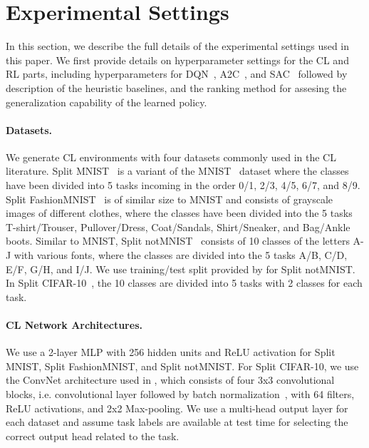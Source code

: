 
\section{Experimental Settings}\label{paperD:app:experimental_settings}

In this section, we describe the full details of the experimental settings used in this paper. We first provide details on hyperparameter settings for the CL and RL parts, including hyperparameters for DQN~, A2C~, and SAC~ followed by description of the heuristic baselines, and the ranking method for assesing the generalization capability of the learned policy.  



\vspace{-3mm}
\paragraph{Datasets.}
We generate CL environments with four datasets commonly used in the CL literature. 
Split MNIST~ is a variant of the MNIST~ dataset where the classes have been divided into 5 tasks incoming in the order 0/1, 2/3, 4/5, 6/7, and 8/9. Split FashionMNIST~ is of similar size to MNIST and consists of grayscale images of different clothes, where the classes have been divided into the 5 tasks T-shirt/Trouser, Pullover/Dress, Coat/Sandals, Shirt/Sneaker, and Bag/Ankle boots. Similar to MNIST, Split notMNIST~ consists of 10 classes of the letters A-J with various fonts, where the classes are divided into the 5 tasks A/B, C/D, E/F, G/H, and I/J. We use training/test split provided by  for Split notMNIST. 
In Split CIFAR-10~, the 10 classes are divided into 5 tasks with 2 classes for each task. 

\vspace{-3mm}
\paragraph{CL Network Architectures.} We use a 2-layer MLP with 256 hidden units and ReLU activation for Split MNIST, Split FashionMNIST, and Split notMNIST. For Split CIFAR-10, we use the ConvNet architecture used in , which consists of four 3x3 convolutional blocks, i.e. convolutional layer followed by batch normalization~, with 64 filters, ReLU activations, and 2x2 Max-pooling. We use a multi-head output layer for each dataset and assume task labels are available at test time for selecting the correct output head related to the task. 


